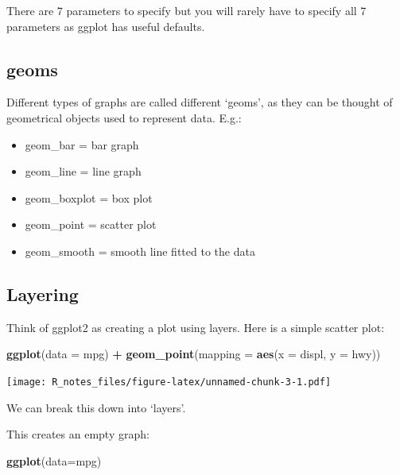\documentclass[]{book}
\newenvironment{Shaded}{\begin{snugshade}}{\end{snugshade}}
\newcommand{\KeywordTok}[1]{\textcolor[rgb]{0.13,0.29,0.53}{\textbf{#1}}}
\newcommand{\DataTypeTok}[1]{\textcolor[rgb]{0.13,0.29,0.53}{#1}}
\newcommand{\StringTok}[1]{\textcolor[rgb]{0.31,0.60,0.02}{#1}}
\newcommand{\OperatorTok}[1]{\textcolor[rgb]{0.81,0.36,0.00}{\textbf{#1}}}
\newcommand{\NormalTok}[1]{#1}
\providecommand{\tightlist}{%
  \setlength{\itemsep}{0pt}\setlength{\parskip}{0pt}}
\begin{document}
There are 7 parameters to specify but you will rarely have to specify
all 7 parameters as ggplot has useful defaults.

\subsection{geoms}\label{geoms}

Different types of graphs are called different `geoms', as they can be
thought of geometrical objects used to represent data. E.g.:

\begin{itemize}
\tightlist
\item
  geom\_bar = bar graph
\item
  geom\_line = line graph
\item
  geom\_boxplot = box plot\\
\item
  geom\_point = scatter plot
\item
  geom\_smooth = smooth line fitted to the data
\end{itemize}

\subsection{Layering}\label{layering}

Think of ggplot2 as creating a plot using layers. Here is a simple
scatter plot:

\begin{Shaded}
\begin{Highlighting}[]
\KeywordTok{ggplot}\NormalTok{(}\DataTypeTok{data =}\NormalTok{ mpg) }\OperatorTok{+}\StringTok{ }
\StringTok{  }\KeywordTok{geom_point}\NormalTok{(}\DataTypeTok{mapping =} \KeywordTok{aes}\NormalTok{(}\DataTypeTok{x =}\NormalTok{ displ, }\DataTypeTok{y =}\NormalTok{ hwy))}
\end{Highlighting}
\end{Shaded}

\texttt{[image: R\_notes\_files/figure-latex/unnamed-chunk-3-1.pdf]}

We can break this down into `layers'.

This creates an empty graph:

\begin{Shaded}
\begin{Highlighting}[]
\KeywordTok{ggplot}\NormalTok{(}\DataTypeTok{data=}\NormalTok{mpg)}
\end{Highlighting}
\end{Shaded}
\end{document}
